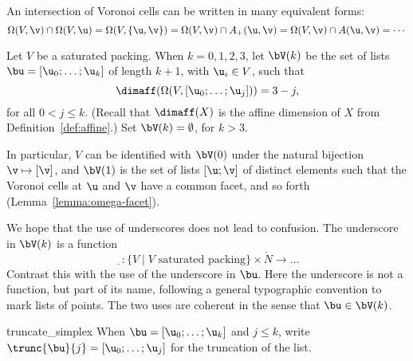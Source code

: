 An intersection of Voronoi cells can be written in many equivalent forms:
\begin{displaymath} 
  \Omega(V,\v)\cap \Omega(V,\u) =\Omega(V,\{\u,\v\})= \Omega(V,\v)\cap A_+(\u,\v) 
  = \Omega(V,\v)\cap A(\u,\v) =  \cdots
\end{displaymath}





\begin{definition}[$\bV$] 
   Let $V$ be a saturated packing.
  When $k=0,1,2,3$, let $ \bV(k)$ be the set of lists
  $\bu=[\u_0;\ldots;\u_k]$ of length $k+1$, with $ \u_i\in V$, such
  that
\begin{equation}\label{eqn:omega-dim} 
\dimaff(\Omega(V,[\u_0;\ldots;\u_j])) = 3-j,
\end{equation}
for all $0<j\le k$.  (Recall that $\dimaff(X)$ is the affine dimension
of $X$ from Definition~\ref{def:affine}.)  Set $\bV(k)=\emptyset$, for
$k>3$.  %
\end{definition}

In particular, $V$ can be identified with $\bV(0)$ under the natural
bijection $\v\mapsto[\v]$, and $\bV(1)$ is the set of lists $[\u;\v]$
of distinct elements such that the Voronoi cells at $ \u$ and $\v$
have a common facet, and so forth (Lemma~\ref{lemma:omega-facet}).  

\begin{notation}[underscore]
  We hope that the use of underscores does not lead to confusion.  The
  underscore in $\bV(k)$ is a function
\begin{displaymath} 
\underline{\phantom V}:\{V \mid \text{$V$ saturated packing} \}
\times \ring{N} \to \ldots
\end{displaymath}
Contrast this with the use of the underscore in $\bu$.  Here the
underscore is not a function, but part of its name, following a
general typographic convention to mark lists of points. The two uses
are coherent in the sense that $\bu\in\bV(k)$.
\end{notation}

\begin{notation}[$\trunc{\bu}{j}$]
%
 {truncate\_simplex}
When $\bu=[\u_0;\ldots;\u_k]$ and $j\le k$, write
$\trunc{\bu}{j} = 
[\u_0;\ldots;\u_j]$ for the truncation of the list.  
%
\end{notation}

